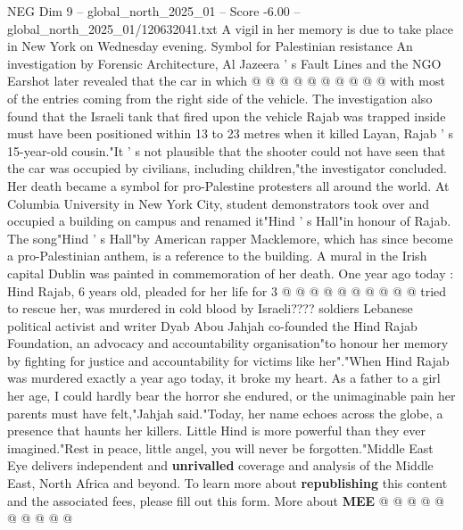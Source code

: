 \begin{textsample}{NEG Dim 9 – global\_north\_2025\_01 – Score -6.00 – global\_north\_2025\_01/120632041.txt}
A vigil in her memory is due to take place in New York on Wednesday evening.
Symbol for Palestinian resistance An investigation by Forensic Architecture, Al Jazeera ' s Fault Lines and the NGO Earshot later revealed that the car in which @ @ @ @ @ @ @ @ @ @ with most of the entries coming from the right side of the vehicle.
The investigation also found that the Israeli tank that fired upon the vehicle Rajab was trapped inside must have been positioned within 13 to 23 metres when it killed Layan, Rajab ' s 15-year-old cousin."It ' s not plausible that the shooter could not have seen that the car was occupied by civilians, including children,"the investigator concluded.
Her death became a symbol for pro-Palestine protesters all around the world.
At Columbia University in New York City, student demonstrators took over and occupied a building on campus and renamed it"Hind ' s Hall"in honour of Rajab.
The song"Hind ' s Hall"by American rapper Macklemore, which has since become a pro-Palestinian anthem, is a reference to the building.
A mural in the Irish capital Dublin was painted in commemoration of her death.
One year ago today : Hind Rajab, 6 years old, pleaded for her life for 3 @ @ @ @ @ @ @ @ @ @ tried to rescue her, was murdered in cold blood by Israeli???? soldiers Lebanese political activist and writer Dyab Abou Jahjah co-founded the Hind Rajab Foundation, an advocacy and accountability organisation"to honour her memory by fighting for justice and accountability for victims like her"."When Hind Rajab was murdered exactly a year ago today, it broke my heart.
As a father to a girl her age, I could hardly bear the horror she endured, or the unimaginable pain her parents must have felt,"Jahjah said."Today, her name echoes across the globe, a presence that haunts her killers.
Little Hind is more powerful than they ever imagined."Rest in peace, little angel, you will never be forgotten."Middle East Eye delivers independent and \textbf{unrivalled} coverage and analysis of the Middle East, North Africa and beyond.
To learn more about \textbf{republishing} this content and the associated fees, please fill out this form.
More about \textbf{MEE} @ @ @ @ @ @ @ @ @ @

\end{textsample}

